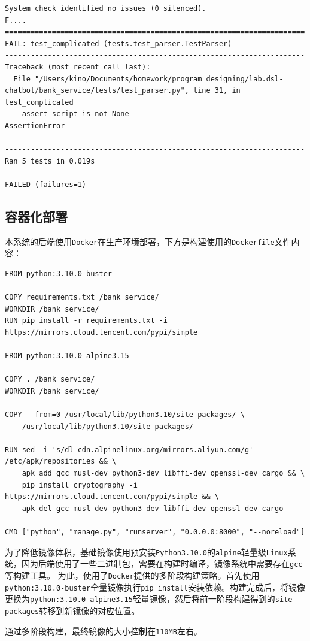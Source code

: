 \documentclass[hyperref]{ctexart}
\begin{document}
\begin{lstlisting}
System check identified no issues (0 silenced).
F....
======================================================================
FAIL: test_complicated (tests.test_parser.TestParser)
----------------------------------------------------------------------
Traceback (most recent call last):
  File "/Users/kino/Documents/homework/program_designing/lab.dsl-chatbot/bank_service/tests/test_parser.py", line 31, in test_complicated
    assert script is not None
AssertionError

----------------------------------------------------------------------
Ran 5 tests in 0.019s

FAILED (failures=1)
\end{lstlisting}
\subsection{容器化部署}
本系统的后端使用\texttt{Docker}在生产环境部署，下方是构建使用的\texttt{Dockerfile}文件内容：
\lstset{
    language=sh
}
\begin{lstlisting}
FROM python:3.10.0-buster

COPY requirements.txt /bank_service/
WORKDIR /bank_service/
RUN pip install -r requirements.txt -i https://mirrors.cloud.tencent.com/pypi/simple

FROM python:3.10.0-alpine3.15

COPY . /bank_service/
WORKDIR /bank_service/

COPY --from=0 /usr/local/lib/python3.10/site-packages/ \
    /usr/local/lib/python3.10/site-packages/

RUN sed -i 's/dl-cdn.alpinelinux.org/mirrors.aliyun.com/g' /etc/apk/repositories && \
    apk add gcc musl-dev python3-dev libffi-dev openssl-dev cargo && \
    pip install cryptography -i https://mirrors.cloud.tencent.com/pypi/simple && \
    apk del gcc musl-dev python3-dev libffi-dev openssl-dev cargo

CMD ["python", "manage.py", "runserver", "0.0.0.0:8000", "--noreload"]
\end{lstlisting}
为了降低镜像体积，基础镜像使用预安装\texttt{Python3.10.0}的\texttt{alpine}轻量级\texttt{Linux}系统，因为后端使用了一些二进制包，需要在构建时编译，镜像系统中需要存在\texttt{gcc}等构建工具。
为此，使用了\texttt{Docker}提供的多阶段构建策略。首先使用\texttt{python:3.10.0-buster}全量镜像执行\texttt{pip install}安装依赖。构建完成后，将镜像更换为\texttt{python:3.10.0-alpine3.15}轻量镜像，然后将前一阶段构建得到的\texttt{site-packages}转移到新镜像的对应位置。
\par 通过多阶段构建，最终镜像的大小控制在\texttt{110MB}左右。
\end{document}
